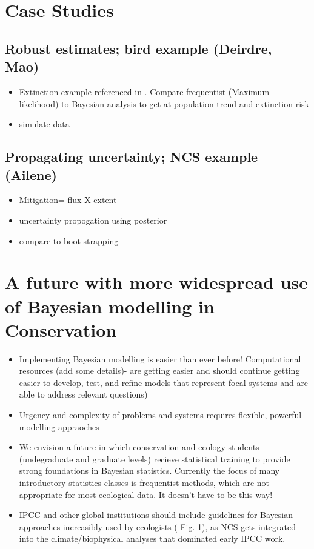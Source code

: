 \documentclass{article}
\begin{document}
\section* {Case Studies}
\subsection*{Robust estimates; bird example (Deirdre, Mao)}
\begin{itemize}

\item Extinction example referenced in \citep{wade2000bayesian}. Compare frequentist (Maximum likelihood) to Bayesian analysis to get at population trend and extinction risk 
\item simulate data
\end{itemize}

\subsection*{Propagating uncertainty; NCS example (Ailene)}
\begin{itemize}
\item Mitigation= flux X extent
\item uncertainty propogation using posterior
\item compare to boot-strapping 
\end{itemize}

\section* {A future with more widespread use of Bayesian modelling in Conservation}
\begin{itemize}
\item Implementing Bayesian modelling is easier than ever before! Computational resources (add some details)- are getting easier and should continue getting easier to develop, test, and refine models that represent focal systems and are able to address relevant questions)
\item Urgency and complexity of problems and systems requires flexible, powerful modelling appraoches 
\item We envision a future in which conservation and ecology students (undegraduate and graduate levels) recieve statistical training to provide strong foundations in Bayesian statistics. Currently the focus of many introductory statistics classes is frequentist methods, which are not appropriate for most ecological data. It doesn't have to be this way! 
\item IPCC and other global institutions should include guidelines for Bayesian approaches increasibly used by ecologists ( Fig. 1), as NCS gets integrated into the climate/biophysical analyses that dominated early IPCC work.
\end{itemize}
\end{document}
